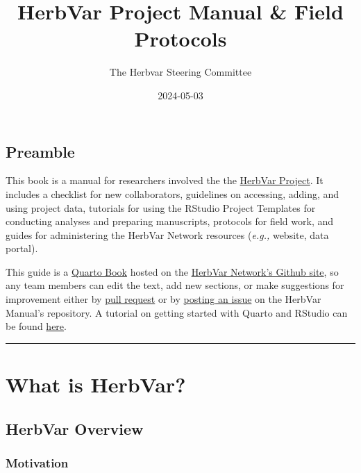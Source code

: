 \documentclass[
  letterpaper,
  DIV=11,
  numbers=noendperiod]{scrreprt}
\title{HerbVar Project Manual \& Field Protocols}
\author{The Herbvar Steering Committee}
\date{2024-05-03}
\renewcommand*\contentsname{Table of contents}
\newcommand\contentsname{Table of contents}
\begin{document}
\maketitle

\renewcommand*\contentsname{Table of contents}
{
\hypersetup{linkcolor=}
\setcounter{tocdepth}{2}
\tableofcontents
}

\chapter*{Preamble}\label{preamble}


This book is a manual for researchers involved the the
\href{https://herbvar.org/}{HerbVar Project}. It includes a checklist
for new collaborators, guidelines on accessing, adding, and using
project data, tutorials for using the RStudio Project Templates for
conducting analyses and preparing manuscripts, protocols for field work,
and guides for administering the HerbVar Network resources (\emph{e.g.,}
website, data portal).

This guide is a \href{https://quarto.org/docs/books}{Quarto Book} hosted
on the \href{https://github.com/HerbVar-Network}{HerbVar Network's
Github site}, so any team members can edit the text, add new sections,
or make suggestions for improvement either by
\href{https://github.com/HerbVar-Network/project_manual/pulls}{pull
request} or by
\href{https://github.com/HerbVar-Network/project_manual/issues}{posting
an issue} on the HerbVar Manual's repository. A tutorial on getting
started with Quarto and RStudio can be found
\href{https://quarto.org/docs/get-started/hello/rstudio.html}{here}.

\begin{center}\rule{0.5\linewidth}{0.5pt}\end{center}

\part{What is HerbVar?}

\chapter{HerbVar Overview}\label{sec-overview}

\section{Motivation}\label{motivation}
\end{document}
